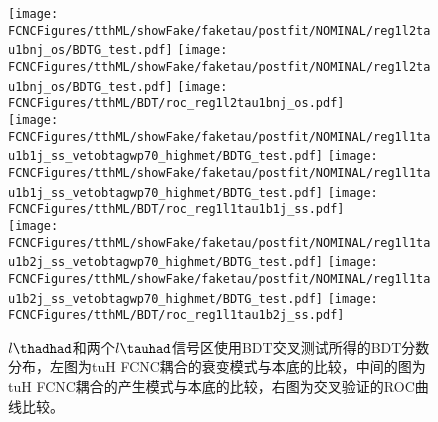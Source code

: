 \begin{figure}[H]
\centering
\texttt{[image: \\FCNCFigures/tthML/showFake/faketau/postfit/NOMINAL/reg1l2tau1bnj\_os/BDTG\_test.pdf]}
\texttt{[image: \\FCNCFigures/tthML/showFake/faketau/postfit/NOMINAL/reg1l2tau1bnj\_os/BDTG\_test.pdf]}
\texttt{[image: \\FCNCFigures/tthML/BDT/roc\_reg1l2tau1bnj\_os.pdf]}\\

\texttt{[image: \\FCNCFigures/tthML/showFake/faketau/postfit/NOMINAL/reg1l1tau1b1j\_ss\_vetobtagwp70\_highmet/BDTG\_test.pdf]}
\texttt{[image: \\FCNCFigures/tthML/showFake/faketau/postfit/NOMINAL/reg1l1tau1b1j\_ss\_vetobtagwp70\_highmet/BDTG\_test.pdf]}
\texttt{[image: \\FCNCFigures/tthML/BDT/roc\_reg1l1tau1b1j\_ss.pdf]}\\

\texttt{[image: \\FCNCFigures/tthML/showFake/faketau/postfit/NOMINAL/reg1l1tau1b2j\_ss\_vetobtagwp70\_highmet/BDTG\_test.pdf]}
\texttt{[image: \\FCNCFigures/tthML/showFake/faketau/postfit/NOMINAL/reg1l1tau1b2j\_ss\_vetobtagwp70\_highmet/BDTG\_test.pdf]}
\texttt{[image: \\FCNCFigures/tthML/BDT/roc\_reg1l1tau1b2j\_ss.pdf]}\\

\caption{$l\thadhad$和两个$l\tauhad$信号区使用BDT交叉测试所得的BDT分数分布，左图为tuH FCNC耦合的衰变模式与本底的比较，中间的图为tuH FCNC耦合的产生模式与本底的比较，右图为交叉验证的ROC曲线比较。}
\label{fig:overtrain_hadhad}
\end{figure}
